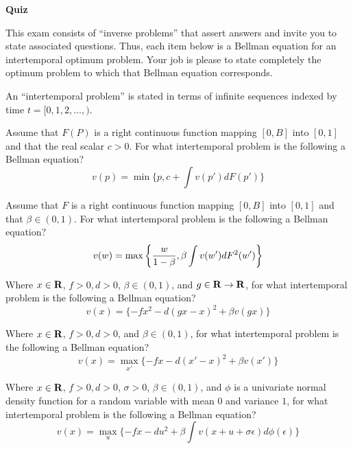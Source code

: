 

\paper

\overfullrule=0pt
\def\frac#1#2{#1\over #2}
%
\def\bmatrix#1{\left[ \matrix{#1} \right]}
\def\be{{\beta}}
\def\toone{{t+1}}

\overfullrule=0pt


\centerline{\bf  Quiz}


\medskip

 This exam consists of  ``inverse problems'' that assert answers and invite you to state  associated questions.
 Thus, each item below is a Bellman equation for an intertemporal  optimum problem.  Your job is please to
state completely the optimum problem to which that Bellman equation corresponds. 

\medskip
{} An ``intertemporal problem'' is stated in terms of  infinite sequences indexed by time $t = [0, 1, 2, \ldots, )$.



\medskip

Assume that  $F(P)$ is a right continuous function mapping $[0, B]$ into $[0,1]$ and that the real scalar $c > 0$.  For what intertemporal problem is the following
a Bellman equation?
$$ v(p) = \min \{p, c + \int v(p') d F(p') \}$$

\medskip



  Assume that  $F$ is a right continuous function mapping $[0, B]$ into $[0,1]$ and that $\beta \in (0,1)$. For what intertemporal problem is the following a Bellman equation?
$$ v(w) = \max\left\{ {w\over{1-\beta}},  \beta \int v(w') d F^2(w') \right\} $$



\medskip
{} Where $x \in {\bf R}$, $f >0, d >0 $,   $\beta \in (0,1)$, and $g \in  {\bf R} \rightarrow {\bf R}$, for what intertemporal problem is the following  a Bellman equation?
$$ v(x) =  \{- f x^2 - d(gx  - x)^2 + \beta v(gx) \} $$


\medskip
{}   Where $x \in {\bf R}$, $f >0, d >0 $, and   $\beta \in (0,1)$, for what intertemporal problem is the following  a Bellman equation?
$$ v(x) = \max_{x'} \{ - f x - d(x' - x)^2 + \beta v(x') \} $$


\medskip
{} Where $x \in {\bf R}$, $f >0, d >0 $, $\sigma >0$,    $\beta \in (0,1)$, and $\phi$ is a univariate normal density function for a random
variable with mean $0$ and variance $1$, for what intertemporal problem is the following  a Bellman equation?
$$ v(x) = \max_{u} \{ - f x - d u^2 + \beta \int v(x +u + \sigma \epsilon) d \phi(\epsilon) \} $$



